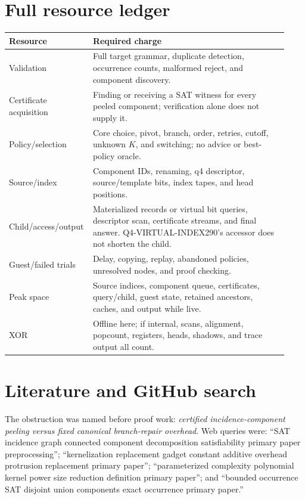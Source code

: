 \documentclass[11pt]{article}
\begin{document}
\section{Full resource ledger}
\begin{longtable}{p{0.24\linewidth}p{0.69\linewidth}}
\toprule
Resource & Required charge\\
\midrule
\endhead
Validation & Full target grammar, duplicate detection, occurrence counts, malformed reject, and component discovery.\\
Certificate acquisition & Finding or receiving a SAT witness for every peeled component; verification alone does not supply it.\\
Policy/selection & Core choice, pivot, branch, order, retries, cutoff, unknown $K$, and switching; no advice or best-policy oracle.\\
Source/index & Component IDs, renaming, q4 descriptor, source/template bits, index tapes, and head positions.\\
Child/access/output & Materialized records or virtual bit queries, descriptor scan, certificate streams, and final answer.  Q4-VIRTUAL-INDEX290's accessor does not shorten the child.\\
Guest/failed trials & Delay, copying, replay, abandoned policies, unresolved nodes, and proof checking.\\
Peak space & Source indices, component queue, certificates, query/child, guest state, retained ancestors, caches, and output while live.\\
XOR & Offline here; if internal, scans, alignment, popcount, registers, heads, shadows, and trace output all count.\\
\bottomrule
\end{longtable}

\section{Literature and GitHub search}
The obstruction was named before proof work: \emph{certified incidence-component peeling versus fixed canonical branch-repair overhead}.  Web queries were: ``SAT incidence graph connected component decomposition satisfiability primary paper preprocessing''; ``kernelization replacement gadget constant additive overhead protrusion replacement primary paper''; ``parameterized complexity polynomial kernel power size reduction definition primary paper''; and ``bounded occurrence SAT disjoint union components exact occurrence primary paper.''
\end{document}
